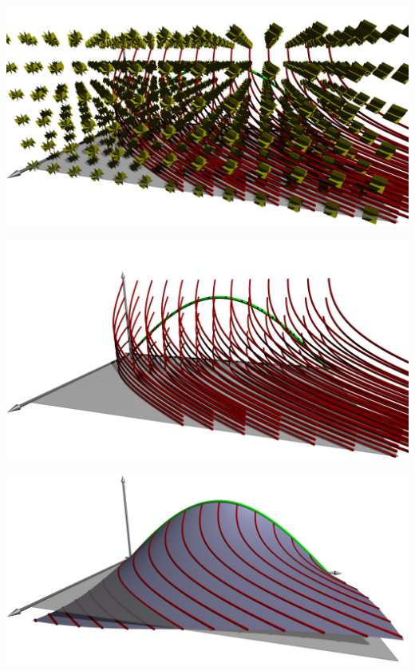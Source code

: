 \documentclass{beamer}
\begin{document}
\begin{frame}
\begin{center}
\includegraphics[width=\hsize]{../../skript/3d/chrpl.jpg}
\end{center}
\end{frame}

\begin{frame}
\begin{center}
\includegraphics[width=\hsize]{../../skript/3d/chr.jpg}
\end{center}
\end{frame}

\begin{frame}
\begin{center}
\includegraphics[width=\hsize]{../../skript/3d/sol.jpg}
\end{center}
\end{frame}
\end{document}
